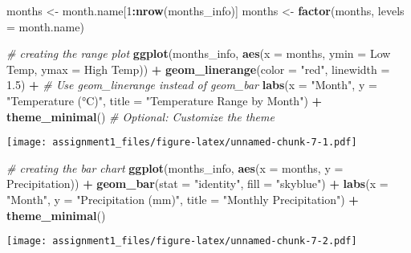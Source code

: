 \documentclass[
]{article}
\newenvironment{Shaded}{\begin{snugshade}}{\end{snugshade}}
\newcommand{\AttributeTok}[1]{\textcolor[rgb]{0.13,0.29,0.53}{#1}}
\newcommand{\CommentTok}[1]{\textcolor[rgb]{0.56,0.35,0.01}{\textit{#1}}}
\newcommand{\DecValTok}[1]{\textcolor[rgb]{0.00,0.00,0.81}{#1}}
\newcommand{\FloatTok}[1]{\textcolor[rgb]{0.00,0.00,0.81}{#1}}
\newcommand{\FunctionTok}[1]{\textcolor[rgb]{0.13,0.29,0.53}{\textbf{#1}}}
\newcommand{\NormalTok}[1]{#1}
\newcommand{\OtherTok}[1]{\textcolor[rgb]{0.56,0.35,0.01}{#1}}
\newcommand{\SpecialCharTok}[1]{\textcolor[rgb]{0.81,0.36,0.00}{\textbf{#1}}}
\newcommand{\StringTok}[1]{\textcolor[rgb]{0.31,0.60,0.02}{#1}}
\begin{document}
\begin{Shaded}
\begin{Highlighting}[]
\NormalTok{months }\OtherTok{\textless{}{-}}\NormalTok{ month.name[}\DecValTok{1}\SpecialCharTok{:}\FunctionTok{nrow}\NormalTok{(months\_info)]}
\NormalTok{months }\OtherTok{\textless{}{-}} \FunctionTok{factor}\NormalTok{(months, }\AttributeTok{levels =}\NormalTok{ month.name)}

\CommentTok{\# creating the range plot}
\FunctionTok{ggplot}\NormalTok{(months\_info, }\FunctionTok{aes}\NormalTok{(}\AttributeTok{x =}\NormalTok{ months, }\AttributeTok{ymin =} \StringTok{\textasciigrave{}}\AttributeTok{Low Temp}\StringTok{\textasciigrave{}}\NormalTok{, }\AttributeTok{ymax =} \StringTok{\textasciigrave{}}\AttributeTok{High Temp}\StringTok{\textasciigrave{}}\NormalTok{)) }\SpecialCharTok{+}
  \FunctionTok{geom\_linerange}\NormalTok{(}\AttributeTok{color =} \StringTok{"red"}\NormalTok{, }\AttributeTok{linewidth =} \FloatTok{1.5}\NormalTok{) }\SpecialCharTok{+}  \CommentTok{\# Use geom\_linerange instead of geom\_bar}
  \FunctionTok{labs}\NormalTok{(}\AttributeTok{x =} \StringTok{"Month"}\NormalTok{, }\AttributeTok{y =} \StringTok{"Temperature (°C)"}\NormalTok{, }\AttributeTok{title =} \StringTok{"Temperature Range by Month"}\NormalTok{) }\SpecialCharTok{+}
  \FunctionTok{theme\_minimal}\NormalTok{()  }\CommentTok{\# Optional: Customize the theme}
\end{Highlighting}
\end{Shaded}

\texttt{[image: assignment1\_files/figure-latex/unnamed-chunk-7-1.pdf]}

\begin{Shaded}
\begin{Highlighting}[]
\CommentTok{\# creating the bar chart}
\FunctionTok{ggplot}\NormalTok{(months\_info, }\FunctionTok{aes}\NormalTok{(}\AttributeTok{x =}\NormalTok{ months, }\AttributeTok{y =}\NormalTok{ Precipitation)) }\SpecialCharTok{+}
  \FunctionTok{geom\_bar}\NormalTok{(}\AttributeTok{stat =} \StringTok{"identity"}\NormalTok{, }\AttributeTok{fill =} \StringTok{"skyblue"}\NormalTok{) }\SpecialCharTok{+}
  \FunctionTok{labs}\NormalTok{(}\AttributeTok{x =} \StringTok{"Month"}\NormalTok{, }\AttributeTok{y =} \StringTok{"Precipitation (mm)"}\NormalTok{, }\AttributeTok{title =} \StringTok{"Monthly Precipitation"}\NormalTok{) }\SpecialCharTok{+}
  \FunctionTok{theme\_minimal}\NormalTok{()}
\end{Highlighting}
\end{Shaded}

\texttt{[image: assignment1\_files/figure-latex/unnamed-chunk-7-2.pdf]}
\end{document}

